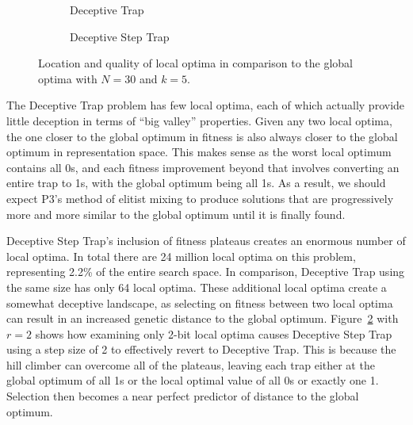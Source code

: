 \begin{figure}[t]
  \begin{centering}
    \begin{subfigure}{.44\textwidth}
      \begin{centering}
      \end{centering}
      \caption{Deceptive Trap}
      \label{fig-valley-dt}
    \end{subfigure}%
    \begin{subfigure}{.56\textwidth}
      \begin{centering}
      \end{centering}
      \caption{Deceptive Step Trap}
      \label{fig-valley-dst}
    \end{subfigure}
  \end{centering}
  \caption{Location and quality of local optima in comparison to the global optima with $N=30$ and $k=5$.}
  \label{fig-valley-trap}
\end{figure}

The Deceptive Trap problem has few local optima, each of which actually
provide little deception in terms of ``big valley'' properties. Given any two local optima, the one
closer to the global optimum in fitness is also always closer to the global optimum in representation space.
This makes sense as the worst local optimum contains all 0s, and each fitness improvement beyond that involves
converting an entire trap to 1s, with the global optimum being all 1s. As a result, we should expect P3's method
of elitist mixing to produce solutions that are progressively more and more similar to the global optimum until
it is finally found.

Deceptive Step Trap's inclusion of fitness plateaus creates an enormous number of local optima. In total there are 24
million local optima on this problem, representing 2.2\% of the entire search space. In comparison, Deceptive Trap using the
same size has only 64 local optima. These additional local optima create a somewhat deceptive landscape, as selecting
on fitness between two local optima can result in an increased genetic distance to the global optimum.
Figure~\ref{fig-valley-dst} with $r=2$ shows how examining only 2-bit local optima causes Deceptive Step Trap using
a step size of 2 to effectively revert to Deceptive Trap. This is because the hill climber can overcome all of the plateaus,
leaving each trap either at the global optimum of all 1s or the local optimal value of all 0s or exactly one 1. Selection then
becomes a near perfect predictor of distance to the global optimum.


